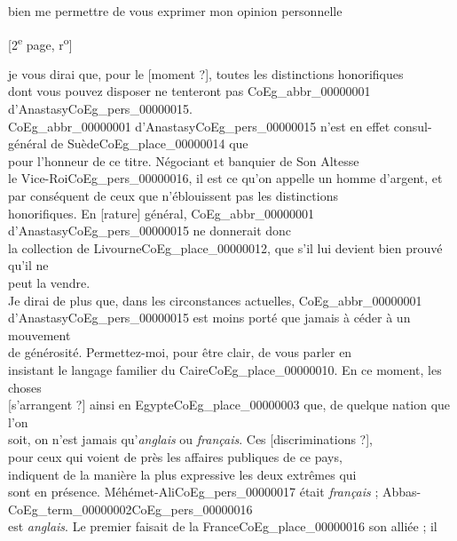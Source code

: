 \documentclass{book}
\begin{document}
bien me permettre de vous exprimer mon opinion personnelle
{\footnotesize \begin{center} [2\textsuperscript{e} page, r\textsuperscript{o}]\end{center}}
\noindent je vous dirai que, pour le [moment ?], toutes les distinctions honorifiques\\
dont vous pouvez disposer ne tenteront pas \gls{CoEg_abbr_00000001} d’Anastasy\gls{CoEg_pers_00000015}.\\
\indent \gls{CoEg_abbr_00000001} d’Anastasy\gls{CoEg_pers_00000015} n’est en effet consul-général de Suède\gls{CoEg_place_00000014} que\\
pour l’honneur de ce titre. Négociant et banquier de Son Altesse\\
le Vice-Roi\gls{CoEg_pers_00000016}, il est ce qu’on appelle un homme d’argent, et\\
par conséquent de ceux que n’éblouissent pas les distinctions\\
honorifiques. En [rature] général, \gls{CoEg_abbr_00000001} d’Anastasy\gls{CoEg_pers_00000015} ne donnerait donc\\
la collection de Livourne\gls{CoEg_place_00000012}, que s’il lui devient bien prouvé qu’il ne\\
peut la vendre.\\
\indent Je dirai de plus que, dans les circonstances actuelles, \gls{CoEg_abbr_00000001}\\
d’Anastasy\gls{CoEg_pers_00000015} est moins porté que jamais à céder à un mouvement\\
de générosité. Permettez-moi, pour être clair, de vous parler en\\
insistant le langage familier du Caire\gls{CoEg_place_00000010}. En ce moment, les choses\\
{[s’arrangent ?]} ainsi en Egypte\gls{CoEg_place_00000003} que, de quelque nation que l’on\\
soit, on n’est jamais qu’\textit{anglais} ou \textit{français}. Ces [discriminations ?],\\
pour ceux qui voient de près les affaires publiques de ce pays,\\
indiquent de la manière la plus expressive les deux extrêmes qui\\
sont en présence. Méhémet-Ali\gls{CoEg_pers_00000017} était \textit{français} ; Abbas-\Gls{CoEg_term_00000002}\gls{CoEg_pers_00000016}\\
est \textit{anglais}. Le premier faisait de la France\gls{CoEg_place_00000016} son alliée ; il\\
\end{document}
